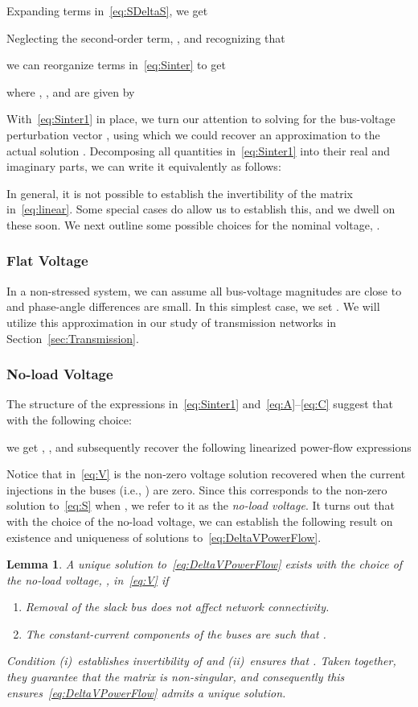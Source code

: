 \documentclass[10 pt, conference]{ieeeconf}
\newtheorem{lemma}{Lemma}
\begin{document}
Expanding terms in~\eqref{eq:SDeltaS}, we get 

Neglecting the second-order term, , and recognizing that

we can reorganize terms in~\eqref{eq:Sinter} to get

where , , and  are given by


With~\eqref{eq:Sinter1} in place, we turn our attention to solving for the bus-voltage perturbation vector , using which we could recover an approximation to the actual solution . Decomposing all quantities in~\eqref{eq:Sinter1} into their real and imaginary parts, we can write it equivalently as follows:

In general, it is not possible to establish the invertibility of the  matrix in~\eqref{eq:linear}. Some special cases do allow us to establish this, and we dwell on these soon. We next outline some possible choices for the nominal voltage, . 

\subsubsection{Flat Voltage} In a non-stressed system, we can assume all bus-voltage magnitudes are close to  and phase-angle differences are small. In this simplest case, we set . We will utilize this approximation in our study of transmission networks in Section~\ref{sec:Transmission}.

\subsubsection{No-load Voltage}
The structure of the expressions in~\eqref{eq:Sinter1} and~\eqref{eq:A}--\eqref{eq:C} suggest that with the following choice: 

we get , , and subsequently recover the following linearized power-flow expressions 

Notice that  in~\eqref{eq:V} is the non-zero voltage solution recovered when the current injections in the buses (i.e., ) are zero. Since this corresponds to the non-zero solution to~\eqref{eq:S} when , we refer to it as the \emph{no-load voltage}. It turns out that with the choice of the no-load voltage, we can establish the following result on existence and uniqueness of solutions to~\eqref{eq:DeltaVPowerFlow}.

\begin{lemma}
\label{lemma:Yinv}
A unique solution to~\eqref{eq:DeltaVPowerFlow} exists with the choice of the no-load voltage, , in~\eqref{eq:V} if
\begin{enumerate}
\item[(i)] Removal of the slack bus does not affect network connectivity. 
\item[(ii)] The constant-current components of the  buses are such that . 
\end{enumerate}
Condition (i)~establishes invertibility of  and (ii)~ensures that . Taken together, they guarantee that the matrix  is non-singular, and consequently this ensures~\eqref{eq:DeltaVPowerFlow} admits a unique solution.\end{lemma}
\end{document}
